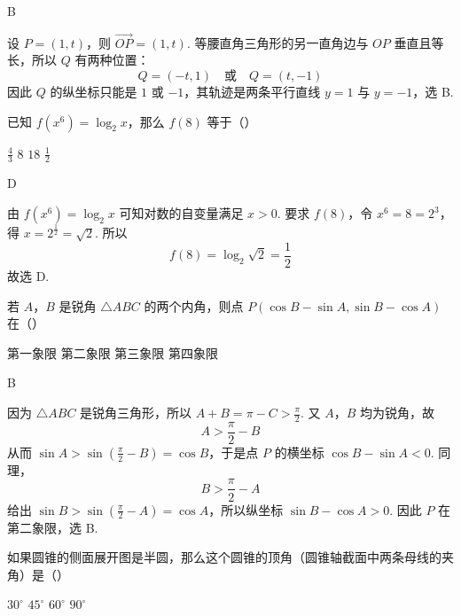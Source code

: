 \begin{answer}
B
\end{answer}

\begin{solution}
设 \(P=(1,t)\)，则 \(\overrightarrow{OP}=(1,t)\). 等腰直角三角形的另一直角边与 \(OP\) 垂直且等长，所以 \(Q\) 有两种位置：
\[
Q=(-t,1)\quad\text{或}\quad Q=(t,-1)
\]
因此 \(Q\) 的纵坐标只能是 \(1\) 或 \(-1\)，其轨迹是两条平行直线 \(y=1\) 与 \(y=-1\)，选 B.
\end{solution}

\begin{problem}
已知 \(f(x^{6}) = \log_{2}x\)，那么 \(f(8)\) 等于（\quad）

\choices
    {\(\frac{4}{3}\)}
    {\(8\)}
    {\(18\)}
    {\(\frac{1}{2}\)}
\end{problem}

\begin{answer}
D
\end{answer}

\begin{solution}
由 \(f(x^6)=\log_2x\) 可知对数的自变量满足 \(x>0\). 要求 \(f(8)\)，令 \(x^6=8=2^3\)，得 \(x=2^{\frac{1}{2}}=\sqrt2\). 所以
\[
f(8)=\log_2\sqrt2=\frac12
\]
故选 D.
\end{solution}

\begin{problem}
若 \(A\)，\(B\) 是锐角 \(\triangle ABC\) 的两个内角，则点 \(P(\cos B - \sin A, \sin B - \cos A)\) 在（\quad）

\choices
    {第一象限}
    {第二象限}
    {第三象限}
    {第四象限}
\end{problem}

\begin{answer}
B
\end{answer}

\begin{solution}
因为 \(\triangle ABC\) 是锐角三角形，所以 \(A+B=\pi-C>\frac\pi2\). 又 \(A\)，\(B\) 均为锐角，故
\[
A>\frac\pi2-B
\]
从而 \(\sin A>\sin\left(\frac\pi2-B\right)=\cos B\)，于是点 \(P\) 的横坐标 \(\cos B-\sin A<0\). 同理，
\[
B>\frac\pi2-A
\]
给出 \(\sin B>\sin\left(\frac\pi2-A\right)=\cos A\)，所以纵坐标 \(\sin B-\cos A>0\). 因此 \(P\) 在第二象限，选 B.
\end{solution}

\begin{problem}
如果圆锥的侧面展开图是半圆，那么这个圆锥的顶角（圆锥轴截面中两条母线的夹角）是（\quad）

\choices
    {\(30^{\circ}\)}
    {\(45^{\circ}\)}
    {\(60^{\circ}\)}
    {\(90^{\circ}\)}
\end{problem}


